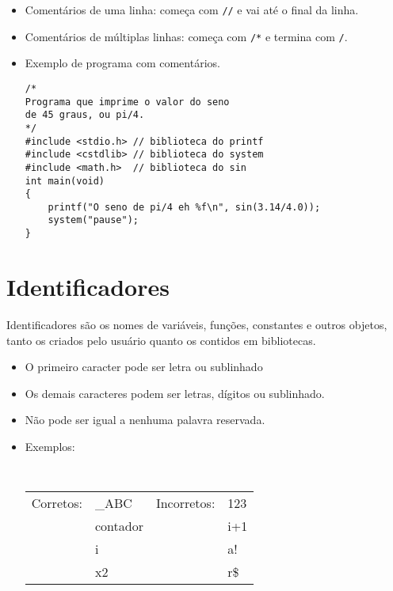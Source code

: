 \documentclass{book}
\begin{document}
\begin{itemize}

\item Comentários de uma linha: começa com {\tt //} e vai até o final da linha.
\item Comentários de múltiplas linhas: começa com {\tt /*} e termina com {\tt */}.

\item Exemplo de programa com comentários.

\begin{lstlisting}
/* 
Programa que imprime o valor do seno
de 45 graus, ou pi/4.
*/
#include <stdio.h> // biblioteca do printf
#include <cstdlib> // biblioteca do system
#include <math.h>  // biblioteca do sin
int main(void)
{
    printf("O seno de pi/4 eh %f\n", sin(3.14/4.0));
    system("pause");
}
\end{lstlisting}


\end{itemize}


\section{Identificadores}
\label{sec:ident}

Identificadores são os nomes de variáveis, funções, constantes e outros objetos, tanto os criados pelo usuário quanto os contidos em bibliotecas.

\begin{itemize}
\item O primeiro caracter pode ser letra ou sublinhado
\item Os demais caracteres podem ser letras, dígitos ou sublinhado.
\item Não pode ser igual a nenhuma palavra reservada.
\item Exemplos:

{\tt
\begin{tabular}{llll}
Corretos:           & \_ABC                 & Incorretos:     & 123       \\
                    & contador              &                 & i+1       \\
                    & i                     &                 & a!        \\
                    & x2                    &                 & r\$       \\
\end{tabular}
}

\end{itemize}
\end{document}
